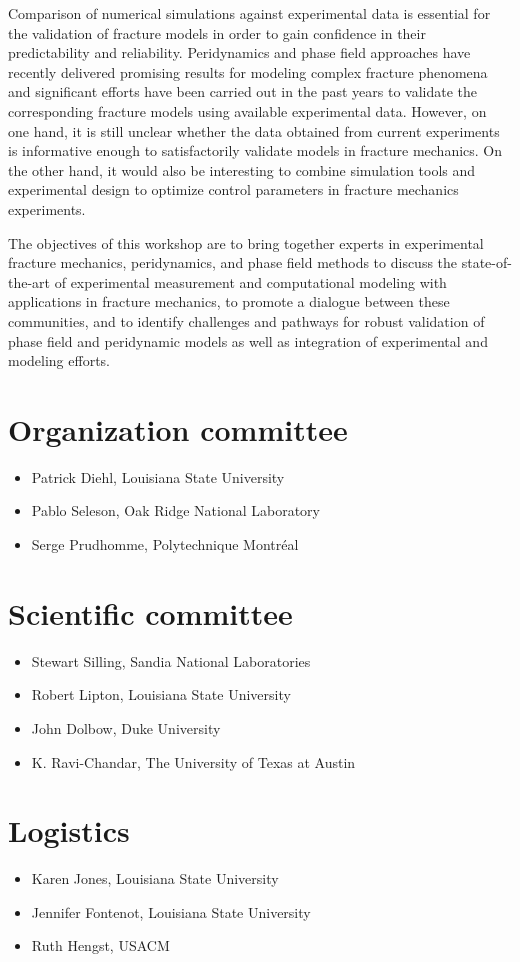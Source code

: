 Comparison of numerical simulations against experimental data is essential
for the validation of fracture models in order to gain confidence in their
predictability and reliability. Peridynamics and phase field approaches have recently
delivered promising results for modeling complex fracture phenomena and significant
efforts have been carried out in the past years to validate the corresponding
fracture models using available experimental data. However, on one hand, it is still
unclear whether the data obtained from current experiments is informative enough to
satisfactorily validate models in fracture mechanics. On the other hand, it would also be
interesting to combine simulation tools and experimental design to optimize
control parameters in fracture mechanics experiments.

The objectives of this workshop are to bring together experts in experimental fracture mechanics,
peridynamics, and phase field methods to discuss the state-of-the-art of experimental
measurement and computational modeling with applications in fracture mechanics, to promote
a dialogue between these communities, and to identify challenges and pathways for robust validation
of phase field and peridynamic models as well as integration of experimental and modeling efforts.

\section*{Organization committee }
\begin{itemize}
\item Patrick Diehl, Louisiana State University
\item Pablo Seleson, Oak Ridge National Laboratory
\item Serge Prudhomme,  Polytechnique Montréal
\end{itemize}

\section*{Scientific committee}
\begin{itemize}
\item Stewart Silling, Sandia National Laboratories
\item Robert Lipton, Louisiana State University
\item John Dolbow, Duke University
\item K. Ravi-Chandar, The University of Texas at Austin
\end{itemize}

\section*{Logistics}
\begin{itemize}
\item Karen Jones, Louisiana State University
\item Jennifer Fontenot, Louisiana State University
\item Ruth Hengst, USACM
\end{itemize}
